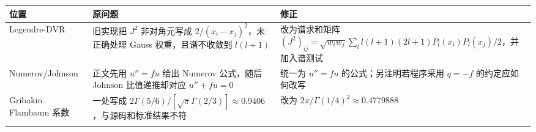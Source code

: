\documentclass[
]{ctexbook}
\begin{document}
\begin{longtable}[]{@{}lll@{}}
\toprule
\begin{minipage}[b]{0.30\columnwidth}\raggedright
位置\strut
\end{minipage} & \begin{minipage}[b]{0.30\columnwidth}\raggedright
原问题\strut
\end{minipage} & \begin{minipage}[b]{0.30\columnwidth}\raggedright
修正\strut
\end{minipage}\tabularnewline
\midrule
\endhead
\begin{minipage}[t]{0.30\columnwidth}\raggedright
Legendre-DVR\strut
\end{minipage} & \begin{minipage}[t]{0.30\columnwidth}\raggedright
旧实现把 \(J^2\) 非对角元写成 \(2/(x_i-x_j)^2\)，未正确处理 Gauss
权重，且谱不收敛到 \(l(l+1)\)\strut
\end{minipage} & \begin{minipage}[t]{0.30\columnwidth}\raggedright
改为谱求和矩阵
\((J^2)_{ij}=\sqrt{w_iw_j}\sum_l l(l+1)(2l+1)P_l(x_i)P_l(x_j)/2\)，并加入谱测试\strut
\end{minipage}\tabularnewline
\begin{minipage}[t]{0.30\columnwidth}\raggedright
Numerov/Johnson\strut
\end{minipage} & \begin{minipage}[t]{0.30\columnwidth}\raggedright
正文先用 \(u''=fu\) 给出 Numerov 公式，随后 Johnson 比值递推却对应
\(u''+fu=0\)\strut
\end{minipage} & \begin{minipage}[t]{0.30\columnwidth}\raggedright
统一为 \(u''=fu\) 的公式；另注明若程序采用 \(q=-f\)
的约定应如何改写\strut
\end{minipage}\tabularnewline
\begin{minipage}[t]{0.30\columnwidth}\raggedright
Gribakin--Flambaum 系数\strut
\end{minipage} & \begin{minipage}[t]{0.30\columnwidth}\raggedright
一处写成
\(2\Gamma(5/6)/[\sqrt\pi\Gamma(2/3)]\approx0.9406\)，与源码和标准结果不符\strut
\end{minipage} & \begin{minipage}[t]{0.30\columnwidth}\raggedright
改为 \(2\pi/\Gamma(1/4)^2\approx0.4779888\)\strut
\end{minipage}\tabularnewline
\begin{minipage}[t]{0.30\columnwidth}\raggedright

\end{minipage}
\end{longtable}
\end{document}
